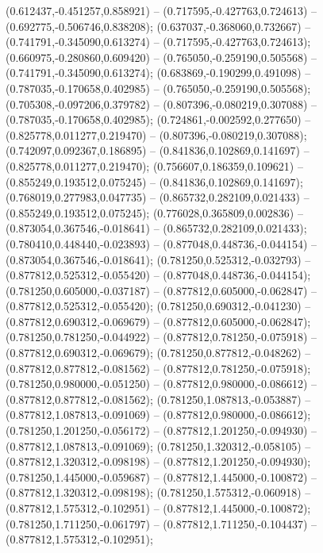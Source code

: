  (0.612437,-0.451257,0.858921) -- (0.717595,-0.427763,0.724613) -- (0.692775,-0.506746,0.838208);
 (0.637037,-0.368060,0.732667) -- (0.741791,-0.345090,0.613274) -- (0.717595,-0.427763,0.724613);
 (0.660975,-0.280860,0.609420) -- (0.765050,-0.259190,0.505568) -- (0.741791,-0.345090,0.613274);
 (0.683869,-0.190299,0.491098) -- (0.787035,-0.170658,0.402985) -- (0.765050,-0.259190,0.505568);
 (0.705308,-0.097206,0.379782) -- (0.807396,-0.080219,0.307088) -- (0.787035,-0.170658,0.402985);
 (0.724861,-0.002592,0.277650) -- (0.825778,0.011277,0.219470) -- (0.807396,-0.080219,0.307088);
 (0.742097,0.092367,0.186895) -- (0.841836,0.102869,0.141697) -- (0.825778,0.011277,0.219470);
 (0.756607,0.186359,0.109621) -- (0.855249,0.193512,0.075245) -- (0.841836,0.102869,0.141697);
 (0.768019,0.277983,0.047735) -- (0.865732,0.282109,0.021433) -- (0.855249,0.193512,0.075245);
 (0.776028,0.365809,0.002836) -- (0.873054,0.367546,-0.018641) -- (0.865732,0.282109,0.021433);
 (0.780410,0.448440,-0.023893) -- (0.877048,0.448736,-0.044154) -- (0.873054,0.367546,-0.018641);
 (0.781250,0.525312,-0.032793) -- (0.877812,0.525312,-0.055420) -- (0.877048,0.448736,-0.044154);
 (0.781250,0.605000,-0.037187) -- (0.877812,0.605000,-0.062847) -- (0.877812,0.525312,-0.055420);
 (0.781250,0.690312,-0.041230) -- (0.877812,0.690312,-0.069679) -- (0.877812,0.605000,-0.062847);
 (0.781250,0.781250,-0.044922) -- (0.877812,0.781250,-0.075918) -- (0.877812,0.690312,-0.069679);
 (0.781250,0.877812,-0.048262) -- (0.877812,0.877812,-0.081562) -- (0.877812,0.781250,-0.075918);
 (0.781250,0.980000,-0.051250) -- (0.877812,0.980000,-0.086612) -- (0.877812,0.877812,-0.081562);
 (0.781250,1.087813,-0.053887) -- (0.877812,1.087813,-0.091069) -- (0.877812,0.980000,-0.086612);
 (0.781250,1.201250,-0.056172) -- (0.877812,1.201250,-0.094930) -- (0.877812,1.087813,-0.091069);
 (0.781250,1.320312,-0.058105) -- (0.877812,1.320312,-0.098198) -- (0.877812,1.201250,-0.094930);
 (0.781250,1.445000,-0.059687) -- (0.877812,1.445000,-0.100872) -- (0.877812,1.320312,-0.098198);
 (0.781250,1.575312,-0.060918) -- (0.877812,1.575312,-0.102951) -- (0.877812,1.445000,-0.100872);
 (0.781250,1.711250,-0.061797) -- (0.877812,1.711250,-0.104437) -- (0.877812,1.575312,-0.102951);
